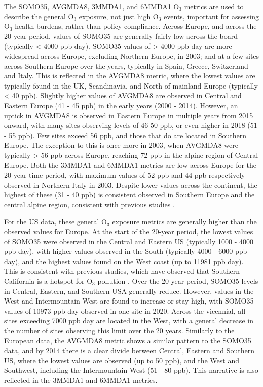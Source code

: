 \documentclass[journal abbreviation, manuscript]{copernicus}
\begin{document}
The SOMO35, AVGMDA8, 3MMDA1, and 6MMDA1 O$_3$ metrics are used to describe the general O$_3$ exposure, not just high O$_3$ events, important for assessing O$_3$ health burdens, rather than policy compliance. Across Europe, and across the 20-year period, values of SOMO35 are generally fairly low across the board (typically < 4000 ppb day). SOMO35 values of > 4000 ppb day are more widespread across Europe, excluding Northern Europe, in 2003; and at a few sites across Southern Europe over the years, typically in Spain, Greece, Switzerland and Italy. This is reflected in the AVGMDA8 metric, where the lowest values are typically found in the UK, Scandinavia, and North of mainland Europe (typically < 40 ppb). Slightly higher values of AVGMDA8 are observed in Central and Eastern Europe (41 - 45 ppb) in the early years (2000 - 2014). However, an uptick in AVGMDA8 is observed in Eastern Europe in multiple years from 2015 onward, with many sites observing levels of 46-50 ppb, or even higher in 2018 (51 - 55 ppb). Few sites exceed 56 ppb, and those that do are located in Southern Europe. The exception to this is once more in 2003, when AVGMDA8 were typically > 56 ppb across Europe, reaching 72 ppb in the alpine region of Central Europe. Both the 3MMDA1 and 6MMDA1 metrics are low across Europe for the 20-year time period, with maximum values of 52 ppb and 44 ppb respectively observed in Northern Italy in 2003. Despite lower values across the continent, the highest of these (31 - 40 ppb) is consistent observed in Southern Europe and the central alpine region, consistent with previous studies \citep{WangKeding2024}.

For the US data, these general O$_3$ exposure metrics are generally higher than the observed values for Europe. At the start of the 20-year period, the lowest values of SOMO35 were observed in the Central and Eastern US (typically 1000 - 4000 ppb day), with higher values observed in the South (typically 4000 - 6000 ppb day), and the highest values found on the West coast (up to 11981 ppb day). This is consistent with previous studies, which have observed that Southern California is a hotspot for O$_3$ pollution \citep{fleming_2018, WangKeding2024}. Over the 20-year period, SOMO35 levels in Central, Eastern, and Southern USA generally reduce. However, values in the West and Intermountain West are found to increase or stay high, with SOMO35 values of 10973 ppb day observed in one site in 2020. Across the vicennial, all sites exceeding 7000 ppb day are located in the West, with a general decrease in the number of sites observing this limit over the 20 years. Similarly to the European data, the AVGMDA8 metric shows a similar pattern to the SOMO35 data, and by 2014 there is a clear divide between Central, Eastern and Southern US, where the lowest values are observed (up to 50 ppb), and the West and Southwest, including the Intermountain West (51 - 80 ppb). This narrative is also reflected in the 3MMDA1 and 6MMDA1 metrics.
\end{document}
